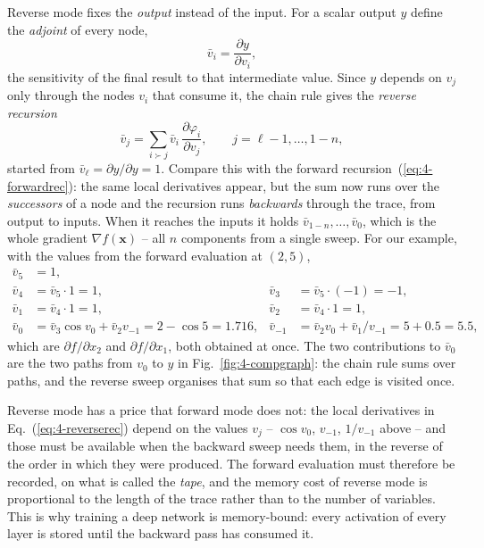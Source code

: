 Reverse mode fixes the \emph{output} instead of the input.  For a scalar
output $y$ define the \emph{adjoint} of every node,
\begin{equation}
  \bar v_i = \frac{\partial y}{\partial v_i},
  \label{eq:4-adjointdef}
\end{equation}
the sensitivity of the final result to that intermediate value.  Since $y$
depends on $v_j$ only through the nodes $v_i$ that consume it, the chain rule
gives the \emph{reverse recursion}
\begin{equation}
  \bar v_j = \sum_{i\succ j}\bar v_i\,\frac{\partial\varphi_i}{\partial v_j},
  \qquad j=\ell-1,\dots,1-n,
  \label{eq:4-reverserec}
\end{equation}
started from $\bar v_\ell=\partial y/\partial y=1$.  Compare this with the
forward recursion~(\ref{eq:4-forwardrec}): the same local derivatives appear,
but the sum now runs over the \emph{successors} of a node and the recursion
runs \emph{backwards} through the trace, from output to inputs.  When it
reaches the inputs it holds $\bar v_{1-n},\dots,\bar v_0$, which is the whole
gradient $\nabla f(\bm{x})$ -- all $n$ components from a single sweep.  For
our example, with the values from the forward evaluation at $(2,5)$,
\begin{equation}
  \begin{aligned}
    \bar v_5 &= 1,\\
    \bar v_4 &= \bar v_5\cdot1 = 1, &
    \bar v_3 &= \bar v_5\cdot(-1) = -1,\\
    \bar v_1 &= \bar v_4\cdot1 = 1, &
    \bar v_2 &= \bar v_4\cdot1 = 1,\\
    \bar v_0 &= \bar v_3\cos v_0 + \bar v_2 v_{-1} = 2-\cos5 = 1.716, &
    \bar v_{-1} &= \bar v_2 v_0 + \bar v_1/v_{-1} = 5 + 0.5 = 5.5 ,
  \end{aligned}
  \label{eq:4-reversesweep}
\end{equation}
which are $\partial f/\partial x_2$ and $\partial f/\partial x_1$, both
obtained at once.  The two contributions to $\bar v_0$ are the two paths
from $v_0$ to $y$ in Fig.~\ref{fig:4-compgraph}: the chain rule sums over
paths, and the reverse sweep organises that sum so that each edge is visited
once.

Reverse mode has a price that forward mode does not: the local derivatives
in Eq.~(\ref{eq:4-reverserec}) depend on the values $v_j$ -- $\cos v_0$,
$v_{-1}$, $1/v_{-1}$ above -- and those must be available when the backward
sweep needs them, in the reverse of the order in which they were produced.
The forward evaluation must therefore be recorded, on what is called the
\emph{tape}, and the memory cost of reverse mode is proportional to the length
of the trace rather than to the number of variables.  This is why training a
deep network is memory-bound: every activation of every layer is stored until
the backward pass has consumed it.

